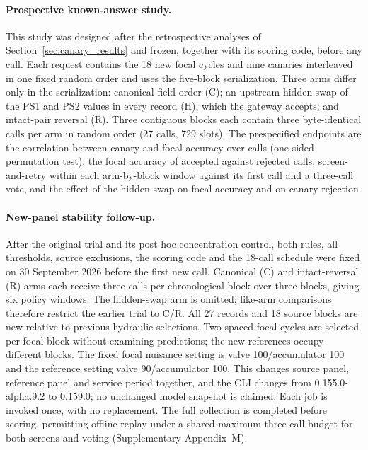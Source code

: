 \documentclass[11pt,a4paper]{article}
\begin{document}
\paragraph{Prospective known-answer study.}\label{sec:prospective} This study was designed after the retrospective analyses of Section~\ref{sec:canary_results} and frozen, together with its scoring code, before any call. Each request contains the 18 new focal cycles and nine canaries interleaved in one fixed random order and uses the five-block serialization. Three arms differ only in the serialization: canonical field order (C); an upstream hidden swap of the PS1 and PS2 values in every record (H), which the gateway accepts; and intact-pair reversal (R). Three contiguous blocks each contain three byte-identical calls per arm in random order (27 calls, 729 slots). The prespecified endpoints are the correlation between canary and focal accuracy over calls (one-sided permutation test), the focal accuracy of accepted against rejected calls, screen-and-retry within each arm-by-block window against its first call and a three-call vote, and the effect of the hidden swap on focal accuracy and on canary rejection.

\paragraph{New-panel stability follow-up.} After the original trial and its post hoc concentration control, both rules, all thresholds, source exclusions, the scoring code and the 18-call schedule were fixed on 30 September 2026 before the first new call. Canonical (C) and intact-reversal (R) arms each receive three calls per chronological block over three blocks, giving six policy windows. The hidden-swap arm is omitted; like-arm comparisons therefore restrict the earlier trial to C/R. All 27 records and 18 source blocks are new relative to previous hydraulic selections. Two spaced focal cycles are selected per focal block without examining predictions; the new references occupy different blocks. The fixed focal nuisance setting is valve 100/accumulator 100 and the reference setting valve 90/accumulator 100. This changes source panel, reference panel and service period together, and the CLI changes from 0.155.0-alpha.9.2 to 0.159.0; no unchanged model snapshot is claimed. Each job is invoked once, with no replacement. The full collection is completed before scoring, permitting offline replay under a shared maximum three-call budget for both screens and voting (Supplementary Appendix~M).
\end{document}
